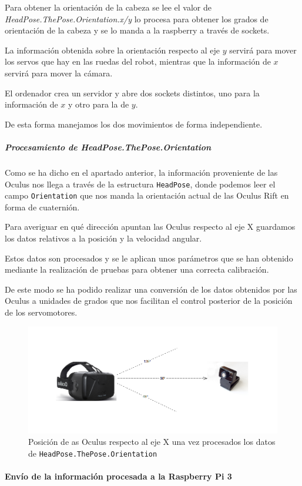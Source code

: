 \documentclass[twoside, 12pt]{epstfg}
\begin{document}
Para obtener la orientación de la cabeza se lee el valor de \textit{HeadPose.ThePose.Orientation.x/y} lo procesa para obtener los grados de orientación de la cabeza y se lo manda a la raspberry a través de sockets.

La información obtenida sobre la orientación respecto al eje $y$ servirá para mover los servos que hay en las ruedas del robot, mientras que la información de $x$ servirá para mover la cámara.


El ordenador crea un servidor y abre dos sockets distintos, uno para la información de $x$ y otro para la de $y$.


De esta forma manejamos los dos movimientos de forma independiente.


\subparagraph{Procesamiento de HeadPose.ThePose.Orientation}

Como se ha dicho en el apartado anterior, la información proveniente de las Oculus nos llega a través de la estructura \texttt{HeadPose}, donde podemos leer el campo \texttt{Orientation} que nos manda la orientación actual de las Oculus Rift en forma de cuaternión.

Para averiguar en qué dirección apuntan las Oculus respecto al eje X guardamos los datos relativos a la posición y la velocidad angular.

 Estos datos son procesados y se le aplican unos parámetros que se han obtenido mediante la realización de pruebas para obtener una correcta calibración.

De este modo se ha podido realizar una conversión de los datos obtenidos por las Oculus a unidades de grados que nos facilitan el control posterior de la posición de los servomotores.

\begin{figure}[h!]
	\centerline{
		\mbox{\includegraphics[width=.80\textwidth]{images/Oculusgrados2.png}}
	}
	\caption{Posición de as Oculus respecto al eje X una vez procesados los datos de \texttt{HeadPose.ThePose.Orientation}}
\end{figure}
\newpage
\paragraph{Envío de la información procesada a la Raspberry Pi 3}
\end{document}

